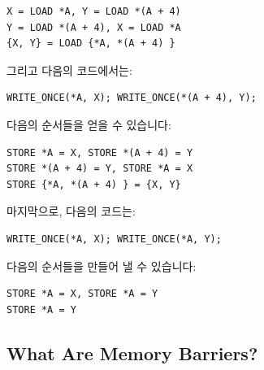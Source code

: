 \begin{enumerate}
\begin{enumerate}
\begin{minipage}[t]{\columnwidth}
\scriptsize
\begin{verbatim}
X = LOAD *A, Y = LOAD *(A + 4)
Y = LOAD *(A + 4), X = LOAD *A
{X, Y} = LOAD {*A, *(A + 4) }
\end{verbatim}
\vspace{1pt}
\end{minipage}

	그리고 다음의 코드에서는:

\begin{minipage}[t]{\columnwidth}
\scriptsize
\begin{verbatim}
WRITE_ONCE(*A, X); WRITE_ONCE(*(A + 4), Y);
\end{verbatim}
\end{minipage}

	다음의 순서들을 얻을 수 있습니다:

\begin{minipage}[t]{\columnwidth}
\scriptsize
\begin{verbatim}
STORE *A = X, STORE *(A + 4) = Y
STORE *(A + 4) = Y, STORE *A = X
STORE {*A, *(A + 4) } = {X, Y}
\end{verbatim}
\vspace{1pt}
\end{minipage}

	마지막으로, 다음의 코드는:

\begin{minipage}[t]{\columnwidth}
\scriptsize
\begin{verbatim}
WRITE_ONCE(*A, X); WRITE_ONCE(*A, Y);
\end{verbatim}
\end{minipage}

	다음의 순서들을 만들어 낼 수 있습니다:

\begin{minipage}[t]{\columnwidth}
\scriptsize
\begin{verbatim}
STORE *A = X, STORE *A = Y
STORE *A = Y
\end{verbatim}
\end{minipage}

\end{enumerate}

\subsection{What Are Memory Barriers?}
\label{sec:advsync:What Are Memory Barriers?}


\end{enumerate}
